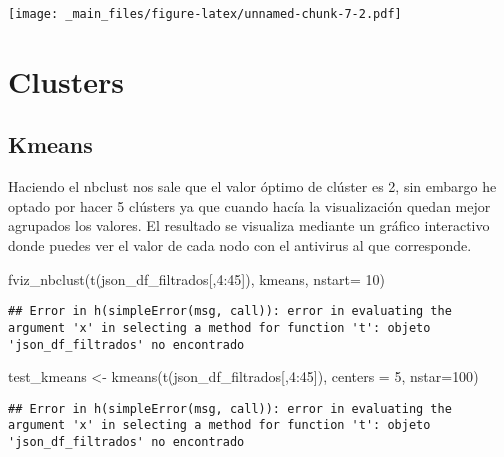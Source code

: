 \documentclass[
]{book}
\newenvironment{Shaded}{\begin{snugshade}}{\end{snugshade}}
\newcommand{\AttributeTok}[1]{\textcolor[rgb]{0.77,0.63,0.00}{#1}}
\newcommand{\DecValTok}[1]{\textcolor[rgb]{0.00,0.00,0.81}{#1}}
\newcommand{\FunctionTok}[1]{\textcolor[rgb]{0.00,0.00,0.00}{#1}}
\newcommand{\NormalTok}[1]{#1}
\newcommand{\OtherTok}[1]{\textcolor[rgb]{0.56,0.35,0.01}{#1}}
\newcommand{\SpecialCharTok}[1]{\textcolor[rgb]{0.00,0.00,0.00}{#1}}
\begin{document}
\texttt{[image: \_main\_files/figure-latex/unnamed-chunk-7-2.pdf]}

\hypertarget{clusters}{%
\chapter{Clusters}\label{clusters}}

\hypertarget{kmeans}{%
\section{Kmeans}\label{kmeans}}

Haciendo el nbclust nos sale que el valor óptimo de clúster es 2, sin embargo he optado por hacer 5 clústers ya que cuando hacía la visualización quedan mejor agrupados los valores. El resultado se visualiza mediante un gráfico interactivo donde puedes ver el valor de cada nodo con el antivirus al que corresponde.

\begin{Shaded}
\begin{Highlighting}[]
\FunctionTok{fviz\_nbclust}\NormalTok{(}\FunctionTok{t}\NormalTok{(json\_df\_filtrados[,}\DecValTok{4}\SpecialCharTok{:}\DecValTok{45}\NormalTok{]), kmeans, }\AttributeTok{nstart=} \DecValTok{10}\NormalTok{) }
\end{Highlighting}
\end{Shaded}

\begin{verbatim}
## Error in h(simpleError(msg, call)): error in evaluating the argument 'x' in selecting a method for function 't': objeto 'json_df_filtrados' no encontrado
\end{verbatim}

\begin{Shaded}
\begin{Highlighting}[]
\NormalTok{test\_kmeans }\OtherTok{\textless{}{-}} \FunctionTok{kmeans}\NormalTok{(}\FunctionTok{t}\NormalTok{(json\_df\_filtrados[,}\DecValTok{4}\SpecialCharTok{:}\DecValTok{45}\NormalTok{]), }\AttributeTok{centers =} \DecValTok{5}\NormalTok{, }\AttributeTok{nstar=}\DecValTok{100}\NormalTok{)}
\end{Highlighting}
\end{Shaded}

\begin{verbatim}
## Error in h(simpleError(msg, call)): error in evaluating the argument 'x' in selecting a method for function 't': objeto 'json_df_filtrados' no encontrado
\end{verbatim}
\end{document}
